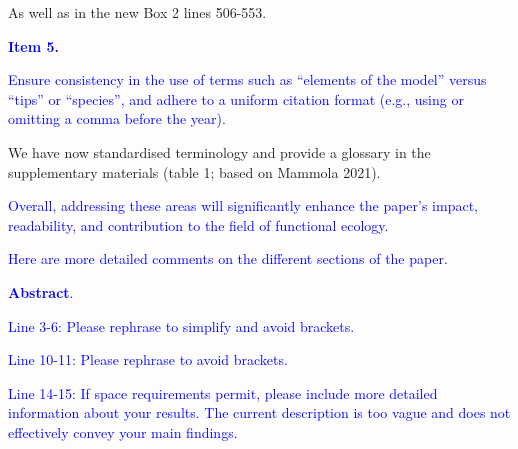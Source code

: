 \documentclass[
]{article}
\begin{document}
As well as in the new Box 2 lines 506-553.

\textcolor{blue}{\textbf{Item 5.}}

\textcolor{blue}{Ensure consistency in the use of terms such as ``elements of the model'' versus ``tips'' or ``species'', and adhere to a uniform citation format (e.g., using or omitting a comma before the year).}

We have now standardised terminology and provide a glossary in the supplementary materials (table 1; based on Mammola 2021).

\textcolor{blue}{Overall, addressing these areas will significantly enhance the paper's impact, readability, and contribution to the field of functional ecology.}

\textcolor{blue}{Here are more detailed comments on the different sections of the paper.}

\textcolor{blue}{\textbf{Abstract}.}

\textcolor{blue}{Line 3-6: Please rephrase to simplify and avoid brackets.}

\textcolor{blue}{Line 10-11: Please rephrase to avoid brackets.}

\textcolor{blue}{Line 14-15: If space requirements permit, please include more detailed information about your results.
The current description is too vague and does not effectively convey your main findings.}
\end{document}
